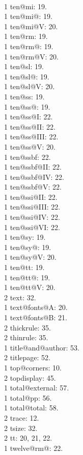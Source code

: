 \\1 ten@mi: 19.
\\1 ten@mi@: 19.
\\1 ten@mi@V: 20.
\\1 ten@rm: 19.
\\1 ten@rm@: 19.
\\1 ten@rm@V: 20.
\\1 ten@sl: 19.
\\1 ten@sl@: 19.
\\1 ten@sl@V: 20.
\\1 ten@ss: 19.
\\1 ten@ss@: 19.
\\1 ten@ss@I: 22.
\\1 ten@ss@II: 22.
\\1 ten@ss@III: 22.
\\1 ten@ss@V: 20.
\\1 ten@ssbf: 22.
\\1 ten@ssbf@II: 22.
\\1 ten@ssbf@IV: 22.
\\1 ten@ssbf@V: 22.
\\1 ten@ssi@II: 22.
\\1 ten@ssi@III: 22.
\\1 ten@ssi@IV: 22.
\\1 ten@ssi@VI: 22.
\\1 ten@sy: 19.
\\1 ten@sy@: 19.
\\1 ten@sy@V: 20.
\\1 ten@tt: 19.
\\1 ten@tt@: 19.
\\1 ten@tt@V: 20.
\\2 text: 32.
\\1 text@fonts@A: 20.
\\1 text@fonts@B: 21.
\\2 thickrule: 35.
\\2 thinrule: 35.
\\1 title@and@author: 53.
\\2 titlepage: 52.
\\1 top@corners: 10.
\\2 topdisplay: 45.
\\1 total@external: 57.
\\1 total@pp: 56.
\\1 total@total: 58.
\\2 trace: 12.
\\2 tsize: 32.
\\2 tt: 20, 21, 22.
\\1 twelve@rm@: 22.
